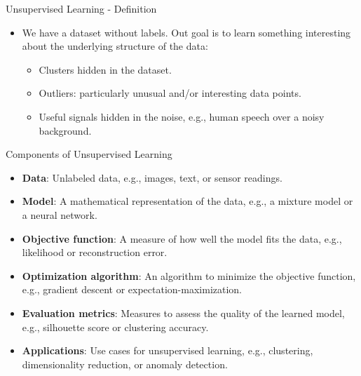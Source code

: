 \begin{frame}[allowframebreaks]{Unsupervised Learning - Definition}
\begin{itemize}
    \item We have a dataset without labels. Out goal is to learn something interesting about the underlying structure of the data:
    \begin{itemize}
        \item Clusters hidden in the dataset.
        \item Outliers: particularly unusual and/or interesting data points.
        \item Useful signals hidden in the noise, e.g., human speech over a noisy background.
    \end{itemize}
\end{itemize}
\end{frame}

\begin{frame}[allowframebreaks]{Components of Unsupervised Learning}
\begin{itemize}
    \item \textbf{Data}: Unlabeled data, e.g., images, text, or sensor readings.
    \item \textbf{Model}: A mathematical representation of the data, e.g., a mixture model or a neural network.
    \item \textbf{Objective function}: A measure of how well the model fits the data, e.g., likelihood or reconstruction error.
    \item \textbf{Optimization algorithm}: An algorithm to minimize the objective function, e.g., gradient descent or expectation-maximization.
    \item \textbf{Evaluation metrics}: Measures to assess the quality of the learned model, e.g., silhouette score or clustering accuracy.
    \item \textbf{Applications}: Use cases for unsupervised learning, e.g., clustering, dimensionality reduction, or anomaly detection.
\end{itemize}
\end{frame}

